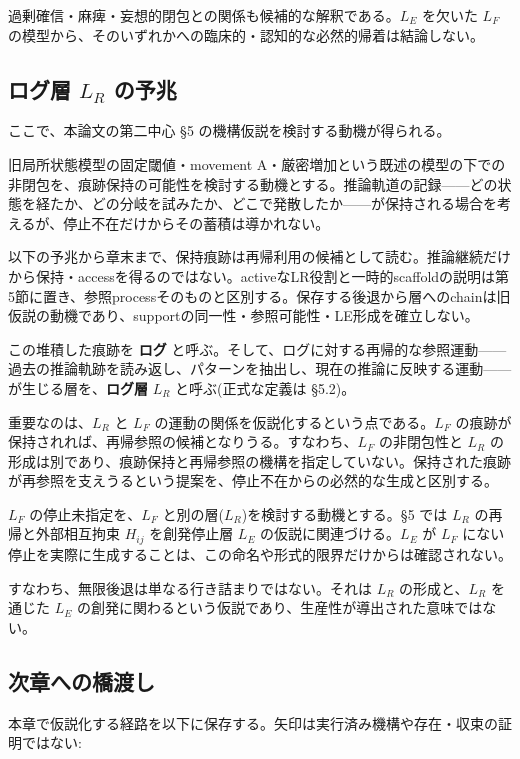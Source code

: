 過剰確信・麻痺・妄想的閉包との関係も候補的な解釈である。$L_E$ を欠いた $L_F$ の模型から、そのいずれかへの臨床的・認知的な必然的帰着は結論しない。

\bigskip


\subsection{ログ層 $L_R$ の予兆}


ここで、本論文の第二中心 \S{}5 の機構仮説を検討する動機が得られる。

旧局所状態模型の固定閾値・movement A・厳密増加という既述の模型の下での非閉包を、痕跡保持の可能性を検討する動機とする。推論軌道の記録——どの状態を経たか、どの分岐を試みたか、どこで発散したか——が保持される場合を考えるが、停止不在だけからその蓄積は導かれない。

以下の予兆から章末まで、保持痕跡は再帰利用の候補として読む。推論継続だけから保持・accessを得るのではない。activeなLR役割と一時的scaffoldの説明は第5節に置き、参照processそのものと区別する。保存する後退から層へのchainは旧仮説の動機であり、supportの同一性・参照可能性・LE形成を確立しない。

この堆積した痕跡を \textbf{ログ} と呼ぶ。そして、ログに対する再帰的な参照運動——過去の推論軌跡を読み返し、パターンを抽出し、現在の推論に反映する運動——が生じる層を、\textbf{ログ層} $L_R$ と呼ぶ(正式な定義は \S{}5.2)。

重要なのは、$L_R$ と $L_F$ の運動の関係を仮説化するという点である。$L_F$ の痕跡が保持されれば、再帰参照の候補となりうる。すなわち、$L_F$ の非閉包性と $L_R$ の形成は別であり、痕跡保持と再帰参照の機構を指定していない。保持された痕跡が再参照を支えうるという提案を、停止不在からの必然的な生成と区別する。

$L_F$ の停止未指定を、$L_F$ と別の層($L_R$)を検討する動機とする。\S{}5 では $L_R$ の再帰と外部相互拘束 $H_{ij}$ を創発停止層 $L_E$ の仮説に関連づける。$L_E$ が $L_F$ にない停止を実際に生成することは、この命名や形式的限界だけからは確認されない。

すなわち、無限後退は単なる行き詰まりではない。それは $L_R$ の形成と、$L_R$ を通じた $L_E$ の創発に関わるという仮説であり、生産性が導出された意味ではない。

\bigskip


\subsection{次章への橋渡し}


本章で仮説化する経路を以下に保存する。矢印は実行済み機構や存在・収束の証明ではない:

